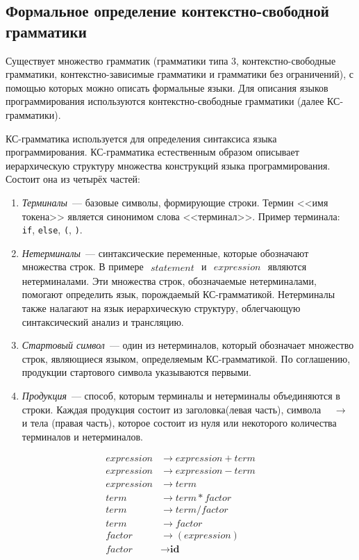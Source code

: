 \subsection{Формальное определение контекстно-свободной грамматики} \label{sub114}

Существует множество грамматик (грамматики типа 3, контекстно-свободные грамматики, контекстно-зависимые грамматики и грамматики без ограничений), с помощью которых можно описать формальные языки. Для описания языков программирования используются контекстно-свободные грамматики  (далее КС-грамматики).

КС-грамматика используется для определения синтаксиса языка программирования. КС-грамматика естественным образом описывает иерархическую структуру множества конструкций языка программирования. Состоит она из четырёх частей:

\begin{enumerate} 
	\item{\textit{Терминалы}~--- базовые символы, формирующие строки. Термин <<имя токена>> является синонимом слова <<терминал>>. Пример терминала: \texttt{if}, \texttt{else}, \texttt{(}, \texttt{)}}.
	\item{\textit{Нетерминалы}~--- синтаксические переменные, которые обозначают множества строк. В примере $\begin{aligned} statement \end{aligned}$ и $\begin{aligned} expression \end{aligned}$ являются нетерминалами. Эти множества строк, обозначаемые нетерминалами, помогают определить язык, порождаемый КС-грамматикой. Нетерминалы также налагают на язык иерархическую структуру, облегчающую синтаксический анализ и трансляцию.}
	\item{\textit{Стартовый символ}~--- один из нетерминалов, который обозначает множество строк, являющиеся языком, определяемым КС-грамматикой. По соглашению, продукции стартового символа указываются первыми.}
	\item{\textit{Продукция}~--- способ, которым терминалы и нетерминалы объединяются в строки. Каждая продукция состоит из заголовка(левая часть), символа $\begin{aligned} &\to \end{aligned}$ и тела (правая часть), которое состоит из нуля или некоторого количества терминалов и нетерминалов.}
\end{enumerate}
\begin{align*}
expression &\to expression + term \\
expression &\to expression - term \\
expression &\to term \\
term &\to term * factor \\
term &\to term / factor \\ 
term &\to factor \\
factor &\to (expression) \\
factor &\to \textbf{id}
\end{align*}